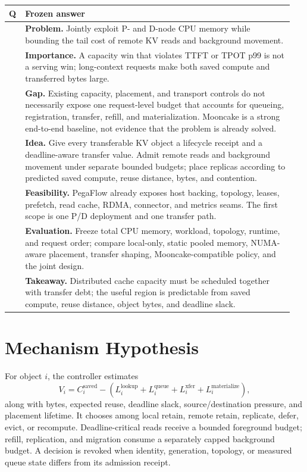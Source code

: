 \documentclass[10pt]{article}
\begin{document}
\begin{longtable}{>{\raggedright\arraybackslash}p{0.05\linewidth}p{0.90\linewidth}}
\toprule
Q & Frozen answer \\
\midrule
1 & \textbf{Problem.} Jointly exploit P- and D-node CPU memory while bounding
the tail cost of remote KV reads and background movement. \\
2 & \textbf{Importance.} A capacity win that violates TTFT or TPOT p99 is not a
serving win; long-context requests make both saved compute and transferred
bytes large. \\
3 & \textbf{Gap.} Existing capacity, placement, and transport controls do not
necessarily expose one request-level budget that accounts for queueing,
registration, transfer, refill, and materialization. Mooncake is a strong
end-to-end baseline, not evidence that the problem is already solved. \\
4 & \textbf{Idea.} Give every transferable KV object a lifecycle receipt and a
deadline-aware transfer value. Admit remote reads and background movement under
separate bounded budgets; place replicas according to predicted saved compute,
reuse distance, bytes, and contention. \\
5 & \textbf{Feasibility.} PegaFlow already exposes host backing, topology,
leases, prefetch, read cache, RDMA, connector, and metrics seams. The first
scope is one P/D deployment and one transfer path. \\
6 & \textbf{Evaluation.} Freeze total CPU memory, workload, topology, runtime,
and request order; compare local-only, static pooled memory, NUMA-aware
placement, transfer shaping, Mooncake-compatible policy, and the joint design. \\
7 & \textbf{Takeaway.} Distributed cache capacity must be scheduled together
with transfer debt; the useful region is predictable from saved compute,
reuse distance, object bytes, and deadline slack. \\
\bottomrule
\end{longtable}

\section{Mechanism Hypothesis}

For object $i$, the controller estimates
\[
V_i = C_i^{\mathrm{saved}} -
(L_i^{\mathrm{lookup}}+L_i^{\mathrm{queue}}+L_i^{\mathrm{xfer}}+
L_i^{\mathrm{materialize}}),
\]
along with bytes, expected reuse, deadline slack, source/destination pressure,
and placement lifetime. It chooses among local retain, remote retain, replicate,
defer, evict, or recompute. Deadline-critical reads receive a bounded foreground
budget; refill, replication, and migration consume a separately capped
background budget. A decision is revoked when identity, generation, topology,
or measured queue state differs from its admission receipt.
\end{document}
